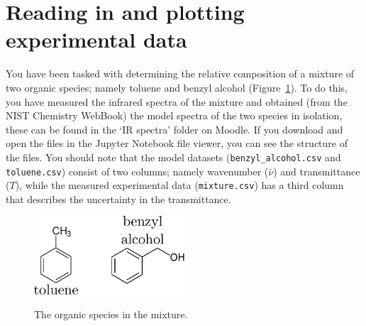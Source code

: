 \documentclass[a4paper]{article}
\begin{document}
\section{Reading in and plotting experimental data}
You have been tasked with determining the relative composition of a mixture of two organic species; namely toluene and benzyl alcohol (Figure~\ref{fig:mole}). 
To do this, you have measured the infrared spectra of the mixture and obtained (from the NIST Chemistry WebBook) the model spectra of the two species in isolation, these can be found in the `IR spectra' folder on Moodle. 
If you download and open the files in the Jupyter Notebook file viewer, you can see the structure of the files. 
You should note that the model datasets (\texttt{benzyl\_alcohol.csv} and \texttt{toluene.csv}) consist of two columns; namely wavenumber ($\bar{\nu}$) and transmittance ($T$), while the measured experimental data (\texttt{mixture.csv}) has a third column that describes the uncertainty in the transmittance. 
%
\begin{figure}[t]
  \centering
  \includegraphics[width=0.5\textwidth]{drawing}
  \label{fig:mole}
  \caption{The organic species in the mixture.}
  \end{figure}
%
\vspace{\baselineskip}
\begin{center}
	\noindent{}
\end{center}
\end{document}
